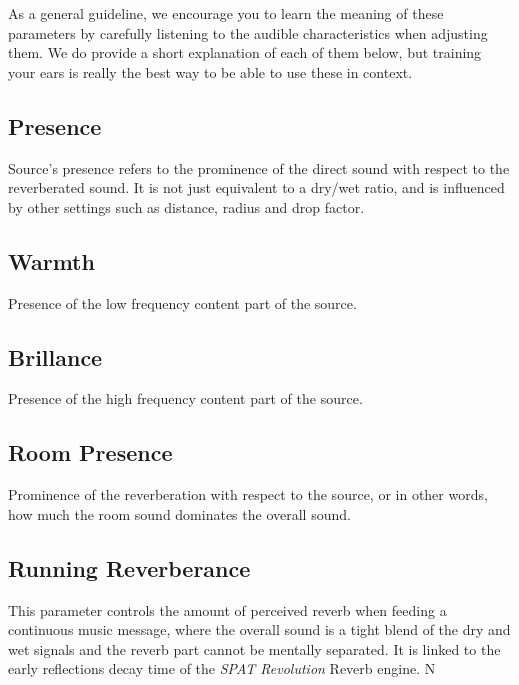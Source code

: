 \documentclass[
  letterpaper,
  DIV=11,
  numbers=noendperiod]{scrreport}
\begin{document}
As a general guideline, we encourage you to learn the meaning of these
parameters by carefully listening to the audible characteristics when
adjusting them. We do provide a short explanation of each of them below,
but training your ears is really the best way to be able to use these in
context.

\hypertarget{presence}{%
\subsection{Presence}\label{presence}}

Source's presence refers to the prominence of the direct sound with
respect to the reverberated sound. It is not just equivalent to a
dry/wet ratio, and is influenced by other settings such as distance,
radius and drop factor.

\hypertarget{warmth}{%
\subsection{Warmth}\label{warmth}}

Presence of the low frequency content part of the source.

\hypertarget{brillance}{%
\subsection{Brillance}\label{brillance}}

Presence of the high frequency content part of the source.

\hypertarget{room-presence}{%
\subsection{Room Presence}\label{room-presence}}

Prominence of the reverberation with respect to the source, or in other
words, how much the room sound dominates the overall sound.

\hypertarget{running-reverberance}{%
\subsection{Running Reverberance}\label{running-reverberance}}

This parameter controls the amount of perceived reverb when feeding a
continuous music message, where the overall sound is a tight blend of
the dry and wet signals and the reverb part cannot be mentally
separated. It is linked to the early reflections decay time of the
\emph{SPAT Revolution} Reverb engine. N
\end{document}
